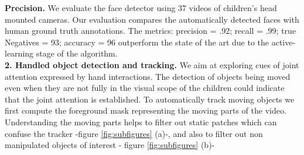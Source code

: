 \documentclass[10pt,letterpaper]{article}
\begin{document}
{\bf Precision.} We evaluate the face detector using 37 videos of children's head mounted cameras.  Our evaluation compares the automatically detected faces with human ground truth annotations. The metrics:  precision = .92; recall = .99; true Negatives = 93; accuracy = 96 outperform the state of the art \cite{dpmface} due to the active-learning stage of the algorithm.\\

{\bf 2. Handled object detection and tracking.} We aim at exploring cues of joint attention expressed by hand interactions. The detection of objects being moved even when they are not fully in the visual scope of the children could indicate that the joint attention is established. To automatically track moving objects we first compute the foreground mask representing the moving parts of the video. Understanding the moving parts helps to filter out static patches which can confuse the tracker -figure  \ref{fig:subfigures} (a)-, and also to filter out non manipulated objects of interest - figure \ref{fig:subfigures} (b)-\\
\end{document}

